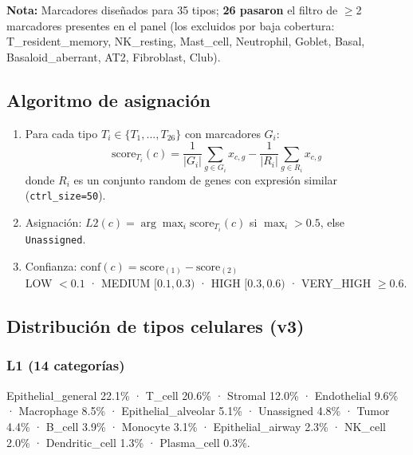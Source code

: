 \documentclass[11pt,a4paper]{article}
\begin{document}
\textbf{Nota:} Marcadores diseñados para 35 tipos; \textbf{26 pasaron} el filtro de $\geq$2 marcadores presentes en el panel (los excluidos por baja cobertura: T\_resident\_memory, NK\_resting, Mast\_cell, Neutrophil, Goblet, Basal, Basaloid\_aberrant, AT2, Fibroblast, Club).

\subsection{Algoritmo de asignación}

\begin{enumerate}[leftmargin=*]
\item Para cada tipo $T_i \in \{T_1, ..., T_{26}\}$ con marcadores $G_i$:
$$ \text{score}_{T_i}(c) = \frac{1}{|G_i|}\sum_{g\in G_i} x_{c,g} - \frac{1}{|R_i|}\sum_{g\in R_i} x_{c,g} $$
donde $R_i$ es un conjunto random de genes con expresión similar (\texttt{ctrl\_size=50}).
\item Asignación: $L2(c) = \arg\max_i \text{score}_{T_i}(c)$ si $\max_i > 0.5$, else \texttt{Unassigned}.
\item Confianza: $\text{conf}(c) = \text{score}_{(1)} - \text{score}_{(2)}$ \\
LOW $<0.1$ · MEDIUM $[0.1, 0.3)$ · HIGH $[0.3, 0.6)$ · VERY\_HIGH $\geq 0.6$.
\end{enumerate}

\subsection{Distribución de tipos celulares (v3)}

\subsubsection{L1 (14 categorías)}
Epithelial\_general 22.1\% · T\_cell 20.6\% · Stromal 12.0\% · Endothelial 9.6\% · Macrophage 8.5\% · Epithelial\_alveolar 5.1\% · Unassigned 4.8\% · Tumor 4.4\% · B\_cell 3.9\% · Monocyte 3.1\% · Epithelial\_airway 2.3\% · NK\_cell 2.0\% · Dendritic\_cell 1.3\% · Plasma\_cell 0.3\%.
\end{document}
